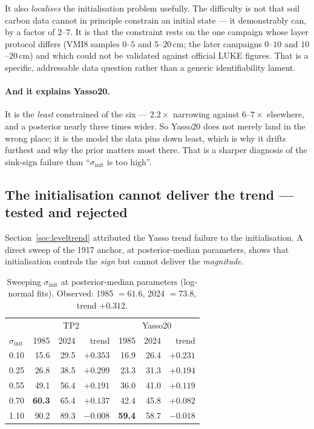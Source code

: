 \documentclass[11pt]{article}
\newcommand{\sinit}{\sigma_{\mathrm{init}}}
\begin{document}
It also \emph{localises} the initialisation problem usefully. The difficulty is not that soil
carbon data cannot in principle constrain an initial state --- it demonstrably can, by a factor
of $2$--$7$. It is that the constraint rests on the one campaign whose layer protocol differs
(VMI8 samples $0$--$5$ and $5$--$20$\,cm; the later campaigns $0$--$10$ and $10$--$20$\,cm) and
which could not be validated against official LUKE figures. That is a specific, addressable
data question rather than a generic identifiability lament.

\paragraph{And it explains Yasso20.} It is the \emph{least} constrained of the six --- $2.2\times$
narrowing against $6$--$7\times$ elsewhere, and a posterior nearly three times wider. So Yasso20
does not merely land in the wrong place; it is the model the data pins down least, which is why
it drifts furthest and why the prior matters most there. That is a sharper diagnosis of the
sink-sign failure than ``$\sinit$ is too high''.

\subsection{The initialisation cannot deliver the trend --- tested and rejected}
\label{sec:sweep}

Section~\ref{sec:leveltrend} attributed the Yasso trend failure to the initialisation. A direct
sweep of the 1917 anchor, at posterior-median parameters, shows that initialisation controls the
\emph{sign} but cannot deliver the \emph{magnitude}.

\begin{table}[H]\centering\small
\caption{Sweeping $\sinit$ at posterior-median parameters (log-normal fits). Observed:
1985 $=61.6$, 2024 $=73.8$, trend $+0.312$.}
\begin{tabular}{lrrr|rrr}
\toprule
 & \multicolumn{3}{c|}{TP2} & \multicolumn{3}{c}{Yasso20}\\
$\sinit$ & 1985 & 2024 & trend & 1985 & 2024 & trend\\
\midrule
0.10 & 15.6 & 29.5 & $+0.353$ & 16.9 & 26.4 & $+0.231$\\
0.25 & 26.8 & 38.5 & $+0.299$ & 23.3 & 31.3 & $+0.194$\\
0.55 & 49.1 & 56.4 & $+0.191$ & 36.0 & 41.0 & $+0.119$\\
0.70 & \textbf{60.3} & 65.4 & $+0.137$ & 42.4 & 45.8 & $+0.082$\\
1.10 & 90.2 & 89.3 & $-0.008$ & \textbf{59.4} & 58.7 & $-0.018$\\
\bottomrule
\end{tabular}
\end{table}
\end{document}
